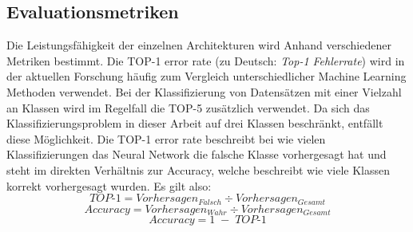 \subsection{Evaluationsmetriken}
\label{Metriken}
Die Leistungsfähigkeit der einzelnen Architekturen wird Anhand verschiedener Metriken bestimmt. Die TOP-1 error rate (zu Deutsch: \textit{Top-1 Fehlerrate}) wird in der aktuellen Forschung häufig zum Vergleich unterschiedlicher Machine Learning Methoden  verwendet. Bei der Klassifizierung von Datensätzen mit einer Vielzahl an Klassen wird im Regelfall die TOP-5 zusätzlich verwendet. Da sich das Klassifizierungsproblem in dieser Arbeit auf drei Klassen beschränkt, entfällt diese Möglichkeit. Die TOP-1 error rate beschreibt bei wie vielen Klassifizierungen das Neural Network die falsche Klasse vorhergesagt hat und steht im direkten Verhältnis zur Accuracy, welche beschreibt wie viele Klassen korrekt vorhergesagt wurden. Es gilt also:
\begin{equation}
TOP\text{-}1 = Vorhersagen_{Falsch} \div Vorhersagen_{Gesamt}
\end{equation}
\begin{equation}
Accuracy = Vorhersagen_{Wahr} \div Vorhersagen_{Gesamt}
\end{equation}
\begin{equation}
Accuracy = 1 \; - \; TOP\text{-}1
\end{equation}

